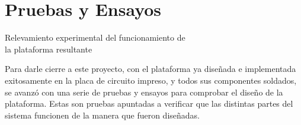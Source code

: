 \section{Pruebas y Ensayos} \label{ensayos}
\thispagestyle{plain}

\vspace{0.5cm}

\Large\scshape
\begin{center}
    {\Medium Relevamiento experimental del funcionamiento de\\ la plataforma resultante}
\end{center}
\normalfont

\divider

Para darle cierre a este proyecto, con el plataforma ya diseñada e implementada exitosamente en la placa de circuito impreso, y todos sus componentes soldados, se avanzó con una serie de pruebas y ensayos para comprobar el diseño de la plataforma. Estas son pruebas apuntadas a verificar que las distintas partes del sistema funcionen de la manera que fueron diseñadas.\\

